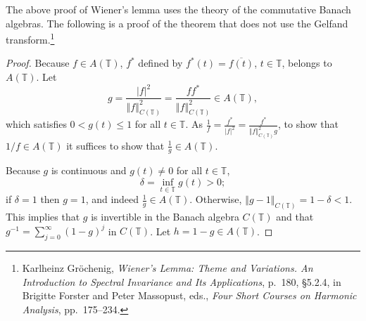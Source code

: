 \documentclass{article}
\newcommand{\norm}[1]{\left\Vert #1 \right\Vert}
\theoremstyle{definition}
\theoremstyle{definition}
\begin{document}
The above proof of Wiener's lemma uses the theory of the commutative Banach algebras.
The following is a proof of the theorem that does not use the Gelfand transform.\footnote{Karlheinz Gr\"ochenig,
{\em Wiener's Lemma: Theme and Variations. An Introduction to
Spectral Invariance and Its Applications}, p.~180, \S 5.2.4, in Brigitte Forster and Peter Massopust, eds., {\em Four Short Courses on Harmonic Analysis}, pp.~175--234.}

\begin{proof}
Because $f \in A(\mathbb{T})$, $f^*$ defined by $f^*(t)=\overline{f(t)}$, $t \in \mathbb{T}$, belongs to $A(\mathbb{T})$.
Let
\[
g=\frac{|f|^2}{\norm{f}_{C(\mathbb{T})}^2}=\frac{ff^*}{\norm{f}_{C(\mathbb{T})}^2} \in A(\mathbb{T}),
\]
which satisfies $0 < g(t) \leq 1$ for all $t \in \mathbb{T}$.
As $\frac{1}{f}=\frac{f^*}{|f|^2}=\frac{f^*}{\norm{f}_{C(\mathbb{T})}^2 g}$, to show that $1/f \in A(\mathbb{T})$ it suffices to show that $\frac{1}{g} \in A(\mathbb{T})$. 

Because $g$ is continuous and $g(t) \neq 0$ for all $t \in \mathbb{T}$,
\[
\delta=\inf_{t \in \mathbb{T}} g(t)>0;
\]
if $\delta=1$ then $g=1$, and indeed $\frac{1}{g} \in A(\mathbb{T})$. Otherwise,
$\norm{g-1}_{C(\mathbb{T})} = 1-\delta<1$.  This implies that $g$ is invertible in the Banach algebra
$C(\mathbb{T})$ and that $g^{-1}=\sum_{j=0}^\infty (1-g)^j$ in $C(\mathbb{T})$. Let
$h=1-g \in A(\mathbb{T})$. 


\end{proof}
\end{document}

